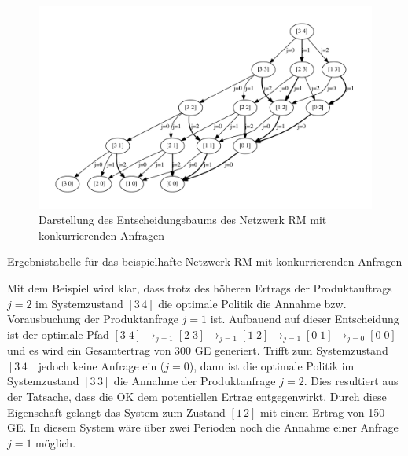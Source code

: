 \begin{figure}[h!]
  \begin{center}
    \includegraphics[width=150mm]{Bilder/Beispiel2.pdf}
    \caption{Darstellung des Entscheidungsbaums des Netzwerk RM mit konkurrierenden Anfragen}  \label{B2}
  \end{center}
\end{figure}

\begin{table}
\begin{footnotesize}
    \caption{Ergebnistabelle für das beispielhafte Netzwerk RM mit konkurrierenden Anfragen} \label{Tab2}
    \vspace*{3mm}
\end{footnotesize}
\end{table}

Mit dem Beispiel wird klar, dass trotz des höheren Ertrags der Produktauftrags $j=2$ im Systemzustand $[3\,4]$ die optimale Politik die Annahme bzw. Vorausbuchung der Produktanfrage $j=1$ ist. Aufbauend auf dieser Entscheidung ist der optimale Pfad $[3\;4] \rightarrow_{j=1} [2\;3] \rightarrow_{j=1} [1\;2] \rightarrow_{j=1} [0\;1]\rightarrow_{j=0} [0\;0]$ und es wird ein Gesamtertrag von 300 GE generiert. Trifft zum Systemzustand $[3\,4]$ jedoch keine Anfrage ein ($j=0$), dann ist die optimale Politik im Systemzustand $[3\,3]$ die Annahme der Produktanfrage $j=2$. Dies resultiert aus der Tatsache, dass die OK dem potentiellen Ertrag entgegenwirkt. Durch diese Eigenschaft gelangt das System zum Zustand $[1\,2]$ mit einem Ertrag von 150 GE. In diesem System wäre über zwei Perioden noch die Annahme einer Anfrage $j=1$ möglich.
